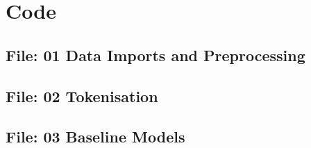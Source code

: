 \documentclass[12pt,a4paper]{report}
\begin{document}
\chapter{Code}
\begin{landscape}
\begin{multicols}{2}
\section{File: 01 Data Imports and Preprocessing}

\end{multicols}
\end{landscape}

\begin{landscape}
\begin{multicols}{2}
\section{File: 02 Tokenisation}

\end{multicols}
\end{landscape}

\begin{landscape}
\begin{multicols}{2}
\section{File: 03 Baseline Models}

\end{multicols}
\end{landscape}

\end{document}
